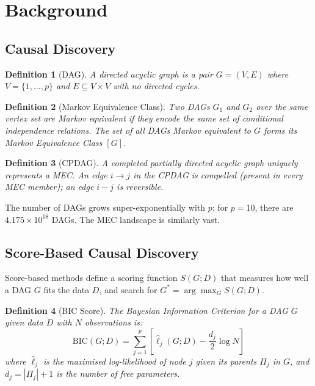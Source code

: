 \documentclass[11pt,a4paper]{article}
\newtheorem{definition}{Definition}
\begin{document}
\section{Background}

\subsection{Causal Discovery}

\begin{definition}[DAG]
A \emph{directed acyclic graph} is a pair $G = (V, E)$ where $V = \{1, \ldots, p\}$ and $E \subseteq V \times V$ with no directed cycles.
\end{definition}

\begin{definition}[Markov Equivalence Class]
Two DAGs $G_1$ and $G_2$ over the same vertex set are \emph{Markov equivalent} if they encode the same set of conditional independence relations. The set of all DAGs Markov equivalent to $G$ forms its \emph{Markov Equivalence Class} $[G]$.
\end{definition}

\begin{definition}[CPDAG]
A \emph{completed partially directed acyclic graph} uniquely represents a MEC. An edge $i \to j$ in the CPDAG is \emph{compelled} (present in every MEC member); an edge $i - j$ is \emph{reversible}.
\end{definition}

The number of DAGs grows super-exponentially with $p$: for $p = 10$, there are $4.175 \times 10^{18}$ DAGs. The MEC landscape is similarly vast.

\subsection{Score-Based Causal Discovery}

Score-based methods define a scoring function $S(G; D)$ that measures how well a DAG $G$ fits the data $D$, and search for $G^* = \arg\max_G S(G; D)$.

\begin{definition}[BIC Score]
The Bayesian Information Criterion for a DAG $G$ given data $D$ with $N$ observations is:
\begin{equation}
    \text{BIC}(G; D) = \sum_{j=1}^{p} \left[ \hat{\ell}_j(G; D) - \frac{d_j}{2} \log N \right]
\end{equation}
where $\hat{\ell}_j$ is the maximised log-likelihood of node $j$ given its parents $\Pi_j$ in $G$, and $d_j = |\Pi_j| + 1$ is the number of free parameters.
\end{definition}
\end{document}
